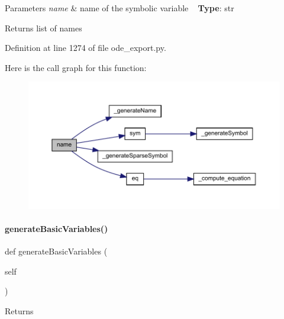 \begin{DoxyParams}{Parameters}
{\em name} & name of the symbolic variable ~\newline
{\bfseries{Type}}\+: str\\
\hline
\end{DoxyParams}
\begin{DoxyReturn}{Returns}
list of names 
\end{DoxyReturn}


Definition at line 1274 of file ode\+\_\+export.\+py.

Here is the call graph for this function\+:
\nopagebreak
\begin{figure}[H]
\begin{center}
\leavevmode
\includegraphics[width=350pt]{classamici_1_1ode__export_1_1_o_d_e_model_a4d110acf8e52c4d48044071ea06952c0_cgraph}
\end{center}
\end{figure}
\mbox{\label{classamici_1_1ode__export_1_1_o_d_e_model_af3b774d51a546704413dc57f93dc427d}} 
\paragraph{\texorpdfstring{generateBasicVariables()}{generateBasicVariables()}}
{\footnotesize\ttfamily def generate\+Basic\+Variables (\begin{DoxyParamCaption}\item[{}]{self }\end{DoxyParamCaption})}

\begin{DoxyReturn}{Returns}

\end{DoxyReturn}


